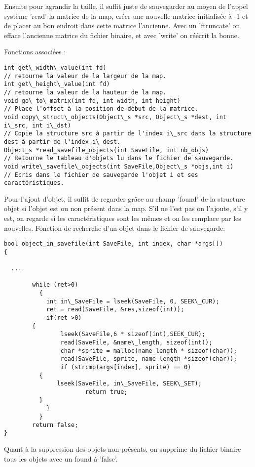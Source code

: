 \documentclass[a4paper]{article}
\begin{document}
Ensuite pour agrandir la taille, il suffit juste de sauvegarder au moyen de l'appel système 'read' la matrice de la map, créer une nouvelle matrice initialisée à -1 et de placer au bon endroit dans cette matrice l'ancienne. Avec un 'ftruncate' on efface l'ancienne matrice du fichier binaire, et avec 'write' on réécrit la bonne.

Fonctions associées :
\begin{verbatim}
int get\_width\_value(int fd)
// retourne la valeur de la largeur de la map.
int get\_height\_value(int fd)
// retourne la valeur de la hauteur de la map.
void go\_to\_matrix(int fd, int width, int height)
// Place l'offset à la position de début de la matrice.
void copy\_struct\_objects(Object\_s *src, Object\_s *dest, int i\_src, int i\_dst)
// Copie la structure src à partir de l'index i\_src dans la structure dest à partir de l'index i\_dest.
Object_s *read_savefile_objects(int SaveFile, int nb_objs)
// Retourne le tableau d'objets lu dans le fichier de sauvegarde.
void write\_savefile\_objects(int SaveFile,Object\_s *objs,int i)
// Ecris dans le fichier de sauvegarde l'objet i et ses caractéristiques.
\end{verbatim}

Pour l'ajout d'objet, il suffit de regarder grâce au champ 'found' de la structure objet si l'objet est ou non présent dans la map. S'il ne l'est pas on l'ajoute, s'il y est, on regarde si les caractéristiques sont les mêmes et on les remplace par les nouvelles.
Fonction de recherche d'un objet dans le fichier de sauvegarde:

\begin{verbatim}
bool object_in_savefile(int SaveFile, int index, char *args[])
{

  ...
  
        while (ret>0)
          {
            int in\_SaveFile = lseek(SaveFile, 0, SEEK\_CUR);
            ret = read(SaveFile, &res,sizeof(int));
            if(ret >0)
	    {
                lseek(SaveFile,6 * sizeof(int),SEEK_CUR);
                read(SaveFile, &name\_length, sizeof(int));
                char *sprite = malloc(name_length * sizeof(char));
                read(SaveFile, sprite, name_length *sizeof(char));
                if (strcmp(args[index], sprite) == 0)
		  {
		       lseek(SaveFile, in\_SaveFile, SEEK\_SET);
                       return true;
		  }
            }
          }
        return false;
}
\end{verbatim}

Quant à la suppression des objets non-présents, on supprime du fichier binaire tous les objets avec un found à 'false'.
\end{document}
